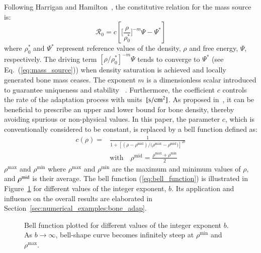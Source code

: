 \documentclass[review]{elsarticle}
\numberwithin{equation}{section}
\begin{document}
Following Harrigan and Hamilton~\citep{Harrigan1993}, the constitutive
relation for the mass source is:
\begin{equation}
\mathcal{R}_{0}=c\left[\Biggl[\frac{\rho}{\rho_{0}^{\ast}}\Biggr]^{-m}\Psi
-\Psi^{\ast}\right]
\label{eq:mass_source}
\end{equation}
where $\rho_0^\ast$ and $\Psi^\ast$ represent reference values of the
density, $\rho$ and free energy, $\Psi$, respectively. The driving term
$\left[ \rho / \rho_0^\ast \right]^{-m}\Psi$ tends to converge to
$\Psi^\ast$ (see Eq.~(\ref{eq:mass_source})) when density saturation is
achieved and locally generated bone mass ceases. The exponent $m$ is a
dimensionless scalar introduced to guarantee uniqueness and
stability~\citep{Harrigan1993} . Furthermore, the coefficient $c$ controls
the rate of the adaptation process with units~$[\rm{s/cm^2}]$. As proposed
in~\citep{Waffenschmidt2012}, it can be beneficial to prescribe an upper and
lower bound for bone density, thereby avoiding spurious or non-physical
values. In this paper, the parameter $c$, which is conventionally considered 
to be constant, is replaced by a bell function
defined as:
\begin{equation}
\begin{aligned}
c(\rho) = & \frac{1}{1 + \left[  (\rho - \rho^{\mathrm{mid}}) / 
(\rho{^\mathrm{max}} - \rho{^\mathrm{mid})} \right]^{2 b}}\\
& \mathrm{with} \quad \rho^{\mathrm{mid}} = 
\frac{\rho{^\mathrm{max}} + \rho{^\mathrm{min}}}{2}
\end{aligned}
\label{eq:bell_function}
\end{equation}
$\rho^\mathrm{max}$ and $ \rho{^\mathrm{min}}$ where $\rho^\mathrm{max}$
and $\rho^\mathrm{min}$ are the maximum and minimum values of $\rho$, and
$\rho^{\rm {mid}}$ is their average. The bell function
(\ref{eq:bell_function}) is illustrated in Figure~\ref{fig:bell_func} for
different values of the integer exponent, $b$. Its application and influence
on the overall results are elaborated in
Section~\ref{sec:numerical_examples:bone_adap}.
\begin{figure}[!htb]
	\centering
		
		\caption{Bell function plotted for different values of the integer exponent $b$. 
		As $b \rightarrow \infty$, bell-shape curve becomes infinitely steep at 
		$\rho{^\mathrm{min}}$ and $ \rho{^\mathrm{max}}$.}
		\label{fig:bell_func}
\end{figure}
\end{document}
